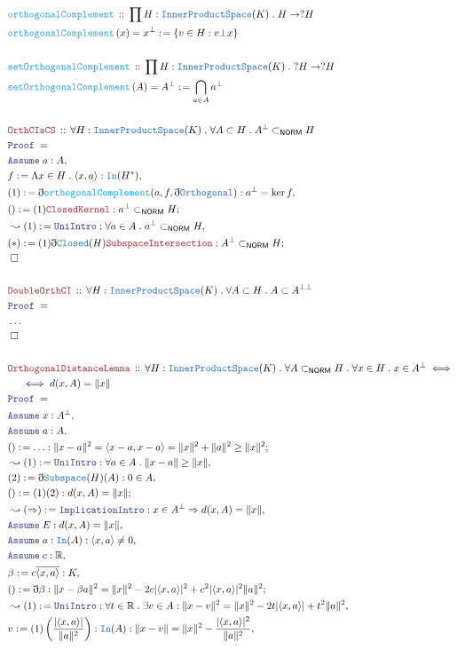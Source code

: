 \documentclass[12pt]{scrartcl}
\newcommand{\TYPE}[1]{\textcolor{NavyBlue}{\mathtt{#1}}}
\newcommand{\FUNC}[1]{\textcolor{Cerulean}{\mathtt{#1}}}
\newcommand{\LOGIC}[1]{\textcolor{Blue}{\mathtt{#1}}}
\newcommand{\THM}[1]{\textcolor{Maroon}{\mathtt{#1}}}
\renewcommand{\.}{\; . \;}
\newcommand{\de}{: \kern 0.1pc =}
\newcommand{\Act}[1]{\left( #1 \right)}
\newcommand{\Theorem}[2]{& \THM{#1} \, :: \, #2 \\ & \Proof = \\ }
\newcommand{\DeclareFunc}[2]{& \FUNC{#1} \, :: \, #2 \\}
\newcommand{\DefineNamedFunc}[4]{&  \FUNC{#1}\Act{#2} = #3 \de #4 \\}
\newcommand{\NewLine}{\\ & \kern 1pc}
\newcommand{\Page}[1]{\begin{align*} #1 \end{align*} \newpage   }
\newcommand{ \bd }{ \ByDef }
\newcommand{\NoProof}{ & \ldots \\ \EndProof}
\newcommand{\Reals}{\mathbb{R} }
\newcommand{\Say}[3]{& #1 \de #2 : #3, \\}
\newcommand{\Conclude}[3]{& #1 \de #2 : #3; \\}
\newcommand{\Derive}[3]{& \leadsto #1 \de #2 : #3, \\}
\newcommand{\A}{\LOGIC{Assume} \;}
\newcommand{\Assume}[2]{& \A #1 : #2, \\}
\newcommand{\QED}{\; \square}
\newcommand{\EndProof}{& \QED \\}
\newcommand{\ByDef}{\eth}
\newcommand{\Proof}{\LOGIC{Proof} \; }
\newcommand{\IPS}{\TYPE{InnerProductSpace}}
\newcommand{\NORM}{\textsf{NORM}}
\begin{document}
\Page{
\DeclareFunc{orthogonalComplement}{\prod H : \IPS(K) \. H \to ?H}
\DefineNamedFunc{orthogonalComplement}{x}{x^\bot}{ \{ v \in H :  v \bot x \}}
\\
\DeclareFunc{setOrthogonalComplement}{\prod H : \IPS(K) \. ?H \to ?H}
\DefineNamedFunc{setOrthogonalComplement}{A}{A^\bot}{ \bigcap_{a \in A} a^\bot  }
\\
\Theorem{OrthCIsCS}{\forall H : \IPS(K) \. \forall A \subset H \. A^\bot \subset_{\NORM} H }
\Assume{a}{A}
\Say{f}{\Lambda x \in H \. \langle x, a \rangle}{\TYPE{In}(H^*)}
\Say{(1)}{\bd \FUNC{orthogonalComplement}(a,f, \bd \TYPE{Orthogonal})}{a^\bot = \ker f}
\Conclude{()}{(1)\THM{ClosedKernel}}{a^\bot \subset_\NORM H}
\Derive{(1)}{\LOGIC{UniIntro}}{\forall a \in A \. a^\bot \subset_\NORM H }
\Conclude{(*)}{(1)\bd\TYPE{Closed}(H)\THM{SubspaceIntersection}}{A^\bot \subset_{\NORM} H }
\EndProof
\\
\Theorem{DoubleOrthCI}{\forall H : \IPS(K) \. \forall A \subset H \. A \subset A^{\bot\bot}  }
\NoProof
\\
\Theorem{OrthogonalDistanceLemma}{\forall H : \IPS(K) \. \forall A \subset_\NORM H \. \forall x \in H \. x \in A^\bot 
\iff \NewLine
\iff d(x,A) = \| x \|}
\Assume{x }{ A^\bot}
\Assume{a }{ A}
\Conclude{()}{\ldots}{\| x - a \|^2 = \langle x - a, x - a \rangle = \| x \|^2 + \| a \|^2 \ge \|x\|^2}
\Derive{(1)}{\LOGIC{UniIntro}}{\forall a \in A \. \| x - a \| \ge \|x\|}
\Say{(2)}{\bd \TYPE{Subspace}(H)(A)}{0 \in A}
\Conclude{()}{(1)(2)}{d(x,A) = \| x \|}
\Derive{(\Rightarrow)}{\LOGIC{ImplicationIntro}}{ x \in A^\bot \Rightarrow d(x,A) = \| x \| }
\Assume{E}{d(x,A) = \| x \|}
\Assume{a}{\TYPE{In}(A) : \langle x, a \rangle \neq 0}
\Assume{c}{\Reals}
\Say{\beta}{c\overline{\langle x, a \rangle}}{K}
\Conclude{()}{\bd \beta}{ \| x - \beta a \|^2 = \| x \|^2 - 2 c  | \langle x, a \rangle |^2 + 
c^2  | \langle x, a \rangle |^2 \| a \|^2
}
\Derive{(1)}{\LOGIC{UniIntro}}{ \forall t \in \Reals  \. \exists v \in A : \| x - v \|^2 = \|x\|^2 - 2t | \langle x, a \rangle | +t^2 \| a \|^2}
\Say{v}{(1)\left( \frac{| \langle x, a \rangle |}{\|a \|^2} \right)}{\TYPE{In}(A) : \| x - v \| = \|x \|^2 - \frac{|\langle x, a \rangle|^2}{\|a\|^2} }
}
\end{document}
